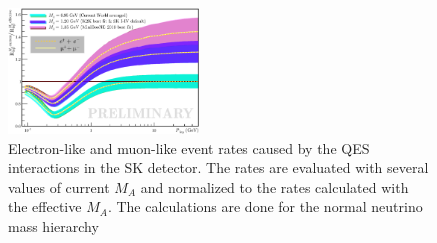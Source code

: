 \begin{figure}[h!]
\begin{center}
\includegraphics[width=0.45\textwidth]{./SK/cvsv2lmn_all2.eps}
\caption{\label{EventRates}Electron-like and muon-like event rates caused by the QES interactions in the SK detector. The rates are evaluated with several values of current $M_A$ and normalized to the rates calculated with the effective $M_A$. The calculations are done for the normal neutrino mass hierarchy}
\end{center}
\end{figure}

